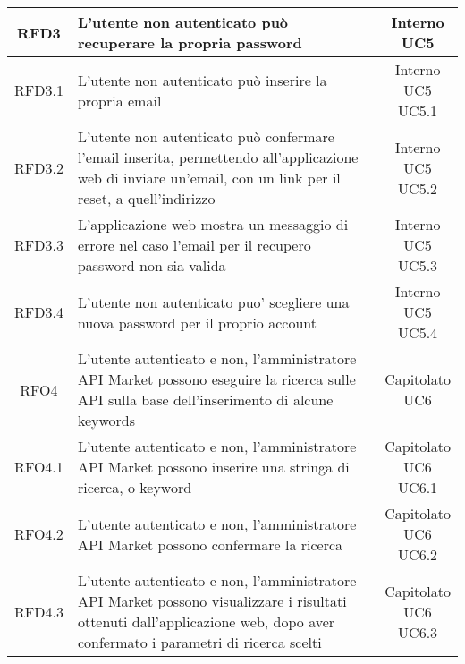 \begin{longtable}{|c|p{8cm}|c|}
RFD3 & L'utente non autenticato può recuperare la propria password & \makecell*{Interno\\UC5} \\
\hline

RFD3.1 & L'utente non autenticato può inserire la propria email & \makecell*{Interno\\UC5\\UC5.1} \\
\hline
RFD3.2 & L'utente non autenticato può confermare l'email inserita, permettendo all'applicazione web di inviare un'email, con un link per il reset, a quell'indirizzo & \makecell*{Interno\\UC5\\UC5.2} \\
\hline
RFD3.3 & L'applicazione web mostra un messaggio di errore nel caso l'email per il recupero password non sia valida & \makecell*{Interno\\UC5\\UC5.3} \\
\hline

\hline
RFD3.4 & L'utente non autenticato puo' scegliere una nuova password per il proprio account & \makecell*{Interno\\UC5\\UC5.4} \\
\hline

RFO4 & L'utente autenticato e non, l'amministratore API Market possono eseguire la ricerca sulle API sulla base dell'inserimento di alcune keywords & \makecell*{Capitolato\\UC6} \\
\hline

RFO4.1 & L'utente autenticato e non, l'amministratore API Market possono inserire una stringa di ricerca, o keyword & \makecell*{Capitolato\\UC6\\UC6.1} \\
\hline

RFO4.2 & L'utente autenticato e non, l'amministratore API Market possono confermare la ricerca  & \makecell*{Capitolato\\UC6\\UC6.2} \\
\hline
RFD4.3 & L'utente autenticato e non, l'amministratore API Market possono visualizzare i risultati ottenuti dall'applicazione web, dopo aver confermato i parametri di ricerca scelti & \makecell*{Capitolato\\UC6\\UC6.3} \\
\hline


\end{longtable}

